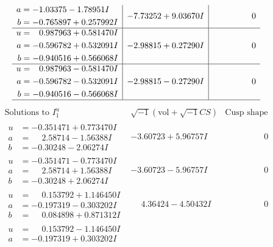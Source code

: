 \documentclass[1p]{elsarticle_modified}
\theoremstyle{definition}
\newcommand{\I}{\sqrt{-1}}
\begin{document}
$$\begin{array}{c|c|c}
\begin{aligned}
a &= -1.03375 - 1.78951 I \\
b &= -0.765897 + 0.257992 I\end{aligned}
 & -7.73252 + 9.03670 I & \phantom{-0.000000 } 0 \\ \hline\begin{aligned}
u &= \phantom{-}0.987963 + 0.581470 I \\
a &= -0.596782 + 0.532091 I \\
b &= -0.940516 + 0.566068 I\end{aligned}
 & -2.98815 + 0.27290 I & \phantom{-0.000000 } 0 \\ \hline\begin{aligned}
u &= \phantom{-}0.987963 - 0.581470 I \\
a &= -0.596782 - 0.532091 I \\
b &= -0.940516 - 0.566068 I\end{aligned}
 & -2.98815 - 0.27290 I & \phantom{-0.000000 } 0\\
 \hline 
 \end{array}$$\newpage$$\begin{array}{c|c|c}  
\text{Solutions to }I^u_{1}& \I (\text{vol} + \sqrt{-1}CS) & \text{Cusp shape}\\
 \hline 
\begin{aligned}
u &= -0.351471 + 0.773470 I \\
a &= \phantom{-}2.58714 - 1.56388 I \\
b &= -0.30248 - 2.06274 I\end{aligned}
 & -3.60723 + 5.96757 I & \phantom{-0.000000 } 0 \\ \hline\begin{aligned}
u &= -0.351471 - 0.773470 I \\
a &= \phantom{-}2.58714 + 1.56388 I \\
b &= -0.30248 + 2.06274 I\end{aligned}
 & -3.60723 - 5.96757 I & \phantom{-0.000000 } 0 \\ \hline\begin{aligned}
u &= \phantom{-}0.153792 + 1.146450 I \\
a &= -0.197319 - 0.303202 I \\
b &= \phantom{-}0.084898 + 0.871312 I\end{aligned}
 & \phantom{-}4.36424 - 4.50432 I & \phantom{-0.000000 } 0 \\ \hline\begin{aligned}
u &= \phantom{-}0.153792 - 1.146450 I \\
a &= -0.197319 + 0.303202 I \\

\end{aligned}
\end{array}$$
\end{document}

